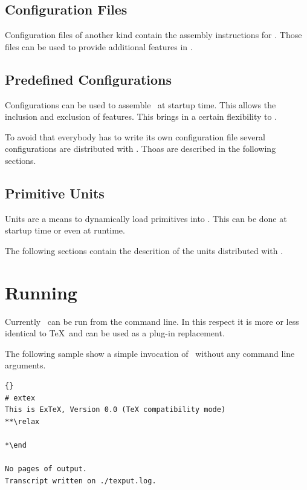\documentclass{extex-doc}
\begin{document}
\subsection{Configuration Files}

Configuration files of another kind contain the assembly instructions
for \ExTeX. Those files can be used to provide additional features in
\ExTeX. 

\INCOMPLETE

\subsection{Predefined Configurations}

Configurations can be used to assemble \ExTeX\ at startup time. This allows the
inclusion and exclusion of features. This brings in a certain flexibility to
\ExTeX.

To avoid that everybody has to write its own configuration file several
configurations are distributed with \ExTeX. Thoas are described in the
following sections.


\subsection{Primitive Units}

Units are a means to dynamically load primitives into \ExTeX. This can be done
at startup time or even at runtime.

The following sections contain the descrition of the units distributed with
\ExTeX.


\section{Running \ExTeX}

Currently \ExTeX\ can be run from the command line. In this respect it
is more or less identical to \TeX\ and can be used as a plug-in
replacement.

The following sample show a simple invocation of \ExTeX\ without any
command line arguments.

{%
\begin{lstlisting}{}
# extex
This is ExTeX, Version 0.0 (TeX compatibility mode)
**\relax

*\end

No pages of output.
Transcript written on ./texput.log.
\end{lstlisting}}
\end{document}

